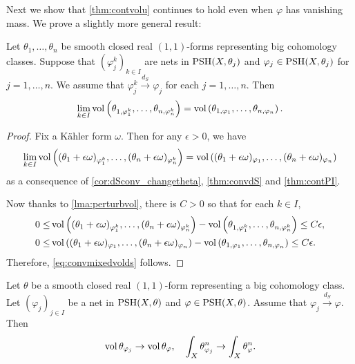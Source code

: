 Next we show that \cref{thm:contvolu} continues to hold even when $\varphi$ has vanishing mass. We prove a slightly more general result:
\begin{theorem}\label{thm:mvolcont}
    Let $\theta_1,\ldots,\theta_n$ be smooth closed real $(1,1)$-forms representing big cohomology classes. Suppose that $(\varphi_j^k)_{k\in I}$ are nets in $\mathrm{PSH}(X,\theta_j)$ and $\varphi_j\in \mathrm{PSH}(X,\theta_j)$ for $j=1,\ldots,n$. We assume that $\varphi_j^k\xrightarrow{d_S}\varphi_j$ for each $j=1,\ldots,n$. Then
    \begin{equation}\label{eq:convmixedvolds}
        \lim_{k\in I}\operatorname{vol} \left( \theta_{1,\varphi_1^k},\ldots, \theta_{n,\varphi_n^k}\right)=\operatorname{vol} \left( \theta_{1,\varphi_1},\ldots, \theta_{n,\varphi_n}\right).
    \end{equation}
\end{theorem}
\begin{proof}
    Fix a Kähler form $\omega$. Then for any $\epsilon>0$, we have
    \[
    \lim_{k\in I}\operatorname{vol} \left( (\theta_1+\epsilon\omega)_{\varphi_1^k},\ldots, (\theta_n+\epsilon\omega)_{\varphi_n^k}\right)=\operatorname{vol} \left( (\theta_1+\epsilon\omega)_{\varphi_1},\ldots, (\theta_n+\epsilon\omega)_{\varphi_n}\right)
    \]
    as a consequence of \cref{cor:dSconv_changetheta}, \cref{thm:convdS} and \cref{thm:contPI}.

    Now thanks to \cref{lma:perturbvol}, there is $C>0$ so that for each $k\in I$,
    \[
    \begin{aligned}
    0\leq & \operatorname{vol} \left( (\theta_1+\epsilon\omega)_{\varphi_1^k},\ldots, (\theta_n+\epsilon\omega)_{\varphi_n^k}\right)-\operatorname{vol} \left( \theta_{1,\varphi_1^k},\ldots, \theta_{n,\varphi_n^k}\right)\leq C\epsilon,\\
    0\leq & \operatorname{vol} \left( (\theta_1+\epsilon\omega)_{\varphi_1},\ldots, (\theta_n+\epsilon\omega)_{\varphi_n}\right)-\operatorname{vol} \left( \theta_{1,\varphi_1},\ldots, \theta_{n,\varphi_n}\right)\leq C\epsilon.
    \end{aligned}
    \]
    Therefore, \eqref{eq:convmixedvolds} follows.
\end{proof}

\begin{corollary}\label{cor:contvolu2}
    Let $\theta$ be a smooth closed real $(1,1)$-form representing a big cohomology class. Let $(\varphi_j)_{j\in I}$ be a net in $\mathrm{PSH}(X,\theta)$ and $\varphi\in \mathrm{PSH}(X,\theta)$. Assume that $\varphi_j\xrightarrow{d_S}\varphi$. Then
    \begin{equation}\label{eq:Ivolcont2}
        \operatorname{vol} \theta_{\varphi_j}\to \operatorname{vol} \theta_{\varphi},\quad \int_X \theta_{\varphi_j}^n\to \int_X \theta_{\varphi}^n.
    \end{equation}
\end{corollary}


